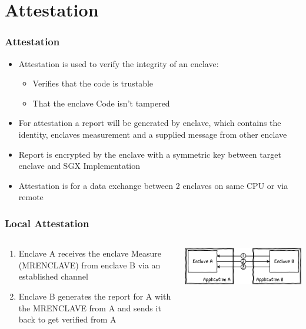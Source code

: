 \section{Attestation}
\begin{frame}
    \frametitle{Attestation}
    \begin{itemize}[<+->]
        \item Attestation is used to verify the integrity of an enclave:
        \begin{itemize}[<+->]
            \item Verifies that the code is trustable
            \item That the enclave Code isn't tampered
        \end{itemize}
        \item For attestation a report will be generated by enclave, which contains the identity, enclaves measurement and a supplied message from other enclave
        \item Report is encrypted by the enclave with a symmetric key between target enclave and SGX Implementation
        \item Attestation is for a data exchange between 2 enclaves on same CPU or via remote 
    \end{itemize}
\end{frame}

\begin{frame}
    \frametitle{Local Attestation}
    \begin{columns}
        \begin{column}{0.4\textwidth}
            \begin{enumerate}[<+->]
                \item Enclave A receives the enclave Measure (MRENCLAVE) from enclave B via an established channel
                
                \item Enclave B generates the report for A with the MRENCLAVE from A and sends it back to get verified from A
            \end{enumerate}
        \end{column}
        \begin{column}{0.6\textwidth}
            \includegraphics[scale=0.45]{Images/local_attestation.png}
        \end{column}
    \end{columns}
\end{frame}


